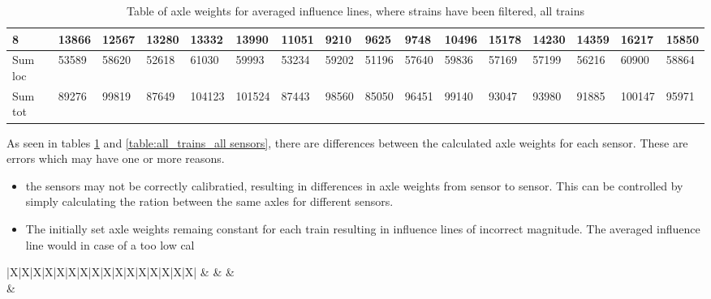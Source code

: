 \begin{table}[h]
\begin{adjustbox}{center}
\begin{tabularx}{\pagewidth}{ |X|X|X|X|X|X|X|X|X|X|X|X|X|X|X|X| }
			\hline
			8 & 13866   &    12567   &    13280   &    13332   &    13990   &    11051   &     9210   &     9625   &     9748   &    10496    &   15178    &   14230    &   14359   &    16217 &	15850 \\
			\hline
			Sum loc & 53589   &    58620   &    52618   &    61030   &    59993   &    53234   &    59202   &    51196   &    57640   &    59836    &   57169    &   57199    &   56216   &    60900 &	58864 \\
			\hline
			Sum tot & 89276   &    99819   &    87649   &   104123   &   101524   &    87443   &    98560   &    85050   &    96451   &    99140    &   93047    &   93980    &   91885   &   100147 &	95971 \\
			\hline
		\end{tabularx}
	\end{adjustbox}
	\caption{Table of axle weights for averaged influence lines, where strains have been filtered, all trains}
	\label{table:axleWeights_filteredStrains_trains_all_sensors}
\end{table}



As seen in tables \ref{table:axleWeights_filteredStrains_trains_all_sensors} and \ref{table:all_trains_all sensors}, there are differences between the calculated axle weights for each sensor. These are errors which may have one or more reasons.
\begin{itemize}
	\item the sensors may not be correctly calibratied, resulting in differences in axle weights from sensor to sensor. This can be controlled by simply calculating the ration between the same axles for different sensors.
	\item The initially set axle weights remaing constant for each train resulting in influence lines of incorrect magnitude. The averaged influence line would in case of a too low cal
\end{itemize}
\begin{table}[h]
	\begin{adjustbox}{center}
		\begin{tabularx}{\pagewidth}{ |X|X|X|X|X|X|X|X|X|X|X|X|X|X|X|X| }
			\hline
			&  &  &  \\
			\hline
			&  \\
			\hline

		\end{tabularx}
	\end{adjustbox}
	\caption{Table of axle weights for averaged influence lines, where strains have been filtered, all trains}
	\label{table:axleWeights_filteredStrains_trains_all_sensors}
\end{table}


